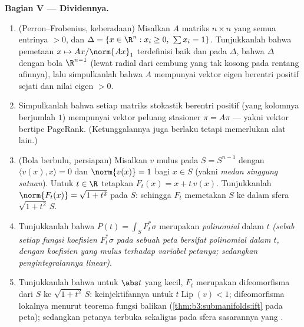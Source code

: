 \begin{problem}
\medskip
\noindent\textbf{Bagian V --- Dividennya.}
\begin{enumerate}[resume]
  \item (Perron--Frobenius, keberadaan) Misalkan $A$ matriks
        $n\times n$ yang semua entrinya $> 0$, dan
        $\Delta = \{x \in \R^n : x_i \geq 0,\ \sum x_i =
        1\}$. Tunjukkanlah bahwa pemetaan $x \mapsto Ax/\norm{Ax}_1$
        terdefinisi baik dan  pada $\Delta$, bahwa
        $\Delta$  dengan bola 
        $\R^{n-1}$ (lewat  radial dari 
        cembung yang  tak kosong pada rentang afinnya),
        lalu simpulkanlah bahwa $A$ mempunyai vektor eigen
        berentri positif sejati dan nilai eigen $> 0$.
  \item Simpulkanlah bahwa setiap matriks stokastik berentri
        positif (yang kolomnya berjumlah $1$) mempunyai vektor
        peluang stasioner $\pi = A\pi$ --- yakni
        vektor bertipe PageRank. (Ketunggalannya juga berlaku tetapi
        memerlukan alat lain.)
  \item (Bola berbulu, persiapan) Misalkan $v$ mulus pada
         $S = S^{n-1}$ dengan $\langle v(x),
        x\rangle = 0$ dan $\norm{v(x)} = 1$ bagi $x \in S$
        (yakni \emph{medan singgung satuan}). Untuk $t \in \R$ tetapkan
        $F_t(x) = x + t\,v(x)$. Tunjukkanlah
        $\norm{F_t(x)} = \sqrt{1 + t^2}$ pada $S$: sehingga $F_t$ memetakan
        $S$ ke dalam sfera $\sqrt{1+t^2}\,S$.
  \item Tunjukkanlah bahwa $P(t) = \int_SF_t^*\sigma$ merupakan
        \emph{polinomial} dalam $t$ \emph{(sebab setiap fungsi
        koefisien $F_t^*\sigma$ pada sebuah peta bersifat polinomial
        dalam $t$, dengan koefisien yang mulus terhadap variabel
        petanya; sedangkan pengintegralannya linear)}.
  \item Tunjukkanlah bahwa untuk $\abs t$ yang kecil, $F_t$ merupakan
        difeomorfisma dari $S$ ke $\sqrt{1+t^2}\,S$:
        keinjektifannya untuk $t\operatorname{Lip}(v) < 1$; difeomorfisma
        lokalnya menurut teorema fungsi balikan
        (\cref{thm:b3:submanifolds:ift} pada peta); sedangkan petanya
        terbuka sekaligus  pada sfera sasarannya yang .

\end{enumerate}
\end{problem}
